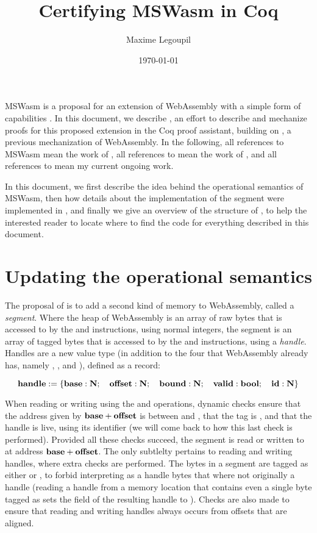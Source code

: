\documentclass[a4paper]{article}
\author{Maxime Legoupil}
\title{Certifying MSWasm in Coq}
\date{\today}
\begin{document}
%
%

\maketitle

MSWasm \cite{mswasm} is a proposal for an extension of WebAssembly \cite{wasm} with
a simple form of capabilities \cite{capabilities}. In this document, we describe \irismswasm,
an effort to describe and mechanize proofs for this proposed extension in the Coq proof assistant,
building on \iriswasm \cite{iriswasm}, a previous mechanization of WebAssembly. In the following, all references to MSWasm mean the work of \citet{mswasm}, all references to \iriswasm mean the work of \citet{iriswasm}, and all references to \irismswasm mean my current ongoing work.

In this document, we first describe the idea behind the operational semantics of MSWasm, then how details about the implementation of the segment were implemented in \irismswasm, and finally we give an overview of the structure of \irismswasm, to help the interested reader to locate where to find the code for everything described in this document.

\section{Updating the operational semantics}

The proposal of \citet{mswasm} is to add a second kind of memory to WebAssembly, called
a \emph{segment}. Where the heap of WebAssembly is an array of raw bytes that is accessed to by
the \xxWload and \xxWstore instructions, using normal \xxWithirtytwo integers, the segment
is an array of tagged bytes that is accessed to by the \xxWsegload and \xxWsegstore instructions,
using a \emph{handle}. Handles are a new value type (in addition to the four that WebAssembly
already has, namely \xxWithirtytwo, \xxWisixtyfour, \xxWfthirtytwo and \xxWfsixtyfour),
defined as a record:

\[ \mathbf{handle} := \{ \mathbf{base} : \mathbf{N}; \quad \mathbf{offset} : \mathbf{N};\quad \mathbf{bound} : \mathbf{N};\quad \mathbf{valid} : \mathbf{bool};\quad \mathbf{id} : \mathbf{N} \} \]

When reading or writing using the \xxWsegload and \xxWsegstore operations, dynamic checks ensure that the address given by \( \mathbf{base} + \mathbf{offset} \) is between \xxWbase and \xxWbound, that the \xxWvalid tag is \xxCtrue, and that the handle is live, using its identifier \xxWid (we will come back to how this last check is performed).
Provided all these checks succeed, the segment is read or written to at address \( \mathbf{base} + \mathbf{offset} \). The only subtlelty pertains to reading and writing handles, where extra checks are performed. The bytes in a segment are tagged as either \xxWNumeric or \xxWHandle, to forbid interpreting as a handle bytes that where not originally a handle (reading a handle from a memory location that contains even a single byte tagged as \xxWNumeric sets the \xxWvalid field of the resulting handle to \xxCfalse). Checks are also made to ensure that reading and writing handles always occurs from offsets that are aligned.
\end{document}
